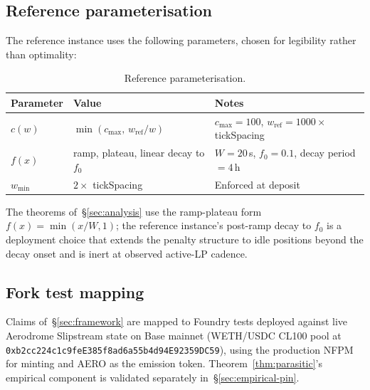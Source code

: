 \documentclass[11pt,a4paper]{article}
\theoremstyle{cgdefinition}
\theoremstyle{cgplain}
\theoremstyle{cgremark}
\begin{document}
\subsection{Reference parameterisation}\label{sec:reference}

The reference instance uses the following parameters, chosen for legibility rather than optimality:

\begin{table}[H]
\centering
\small
\begin{tabular}{@{}L{2.8cm}L{5.0cm}L{6.8cm}@{}}
\toprule
Parameter & Value & Notes \\
\midrule
$c(w)$ & $\min(c_{\max},\, w_{\text{ref}}/w)$ & $c_{\max} = 100$, $w_{\text{ref}} = 1000 \times$ tickSpacing \\
$f(x)$ & ramp, plateau, linear decay to $f_0$ & $W = 20$\,s, $f_0 = 0.1$, decay period $= 4$\,h \\
$w_{\min}$ & $2 \times$ tickSpacing & Enforced at deposit \\
\bottomrule
\end{tabular}
\caption{Reference parameterisation.}
\label{tab:reference}
\end{table}

The theorems of~\S\ref{sec:analysis} use the ramp-plateau form $f(x) = \min(x/W, 1)$; the reference instance's post-ramp decay to $f_0$ is a deployment choice that extends the penalty structure to idle positions beyond the decay onset and is inert at observed active-LP cadence.

\subsection{Fork test mapping}\label{sec:testmap}

Claims of~\S\ref{sec:framework} are mapped to Foundry tests deployed against live Aerodrome Slipstream state on Base mainnet (WETH/USDC CL100 pool at \texttt{0xb2cc224c1c9feE385f8ad6a55b4d94E92359DC59}), using the production NFPM for minting and AERO as the emission token. Theorem~\ref{thm:parasitic}'s empirical component is validated separately in~\S\ref{sec:empirical-pin}.
\end{document}
